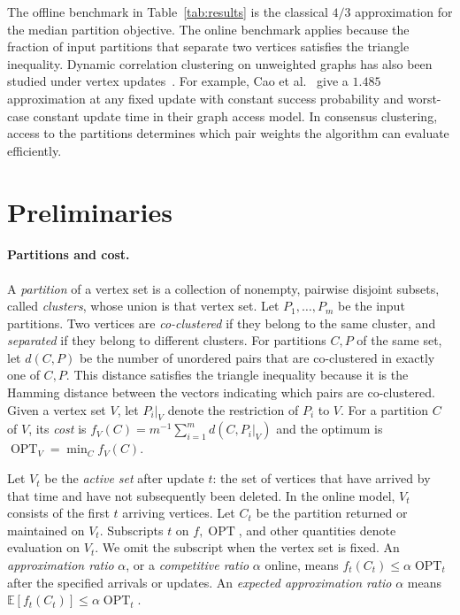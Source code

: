 \documentclass[11pt]{article}
\newcommand{\OPT}{\operatorname{OPT}}
\begin{document}
The offline benchmark in Table~\ref{tab:results} is the classical
$4/3$ approximation for the median partition objective. The
online benchmark applies because the fraction of input partitions
that separate two vertices satisfies the triangle inequality.
Dynamic correlation clustering on unweighted graphs has also been
studied under vertex updates~\cite{CLMP2024Dynamic,CaoEtAl2026Dynamic}.
For example, Cao et al.~\cite{CaoEtAl2026Dynamic} give a $1.485$
approximation at any fixed update with constant success probability
and worst-case constant update time in their graph access model.
In consensus clustering, access to the partitions determines which
pair weights the algorithm can evaluate efficiently.

\section{Preliminaries}
\label{sec:preliminaries}

\paragraph{Partitions and cost.}
A \emph{partition} of a vertex set is a collection of nonempty, pairwise
disjoint subsets, called \emph{clusters}, whose union is that vertex set. Let
$P_1,\ldots,P_m$ be the input partitions. Two vertices are \emph{co-clustered} if they belong to
the same cluster, and \emph{separated} if they belong to different clusters.
For partitions $C,P$ of the same set, let $d(C,P)$ be the number of
unordered pairs that are co-clustered in exactly one of $C,P$. This
distance satisfies the triangle inequality because it is the Hamming
distance between the vectors indicating which pairs are co-clustered.
Given a vertex set $V$, let $P_i|_V$ denote the restriction of $P_i$ to $V$.
For a partition $C$ of $V$, its \emph{cost} is $f_V(C)=m^{-1}\sum_{i=1}^m d(C,P_i|_V)$
and the optimum is $\OPT_V=\min_C f_V(C)$.

Let $V_t$ be the \emph{active set} after update $t$: the set of vertices
that have arrived by that time and have not subsequently been deleted.
In the online model, $V_t$ consists of the first $t$ arriving vertices.
Let $C_t$ be the partition returned or maintained on $V_t$. Subscripts $t$ on $f,\OPT$, and
other quantities denote evaluation on $V_t$. We omit the subscript when
the vertex set is fixed. An \emph{approximation ratio} $\alpha$, or a
\emph{competitive ratio} $\alpha$ online, means $f_t(C_t)\le\alpha\OPT_t$
after the specified arrivals or updates. An \emph{expected approximation ratio} $\alpha$
means $\mathbb E[f_t(C_t)]\le\alpha\OPT_t$.
\end{document}
